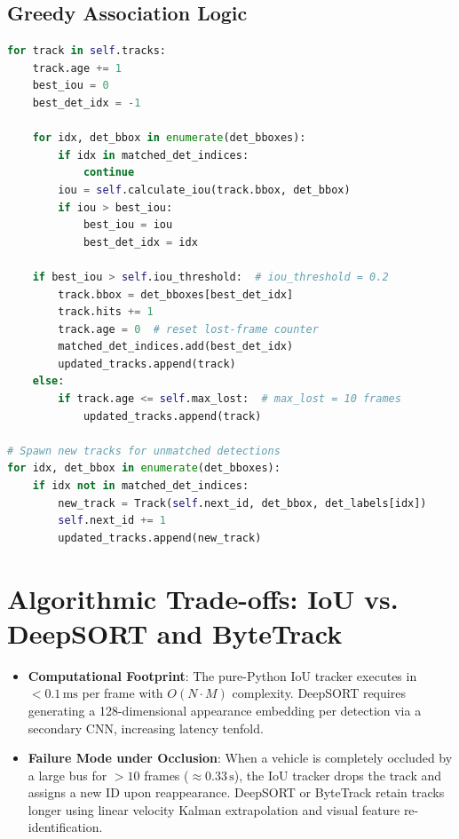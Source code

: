 \documentclass[11pt,a4paper,oneside]{report}
\begin{document}
\subsection{Greedy Association Logic}
\begin{lstlisting}[language=Python,caption={IoU Matching Engine (\texttt{backend/tracker\_manager.py})}]
for track in self.tracks:
    track.age += 1
    best_iou = 0
    best_det_idx = -1

    for idx, det_bbox in enumerate(det_bboxes):
        if idx in matched_det_indices:
            continue
        iou = self.calculate_iou(track.bbox, det_bbox)
        if iou > best_iou:
            best_iou = iou
            best_det_idx = idx

    if best_iou > self.iou_threshold:  # iou_threshold = 0.2
        track.bbox = det_bboxes[best_det_idx]
        track.hits += 1
        track.age = 0  # reset lost-frame counter
        matched_det_indices.add(best_det_idx)
        updated_tracks.append(track)
    else:
        if track.age <= self.max_lost:  # max_lost = 10 frames
            updated_tracks.append(track)

# Spawn new tracks for unmatched detections
for idx, det_bbox in enumerate(det_bboxes):
    if idx not in matched_det_indices:
        new_track = Track(self.next_id, det_bbox, det_labels[idx])
        self.next_id += 1
        updated_tracks.append(new_track)
\end{lstlisting}

\section{Algorithmic Trade-offs: IoU vs. DeepSORT and ByteTrack}
\begin{itemize}[leftmargin=*]
    \item \textbf{Computational Footprint}: The pure-Python IoU tracker executes in $< 0.1\,\text{ms}$ per frame with $O(N \cdot M)$ complexity. DeepSORT requires generating a 128-dimensional appearance embedding per detection via a secondary CNN, increasing latency tenfold.
    \item \textbf{Failure Mode under Occlusion}: When a vehicle is completely occluded by a large bus for $> 10$ frames ($\approx 0.33\,\text{s}$), the IoU tracker drops the track and assigns a new ID upon reappearance. DeepSORT or ByteTrack retain tracks longer using linear velocity Kalman extrapolation and visual feature re-identification.
\end{itemize}
\end{document}
